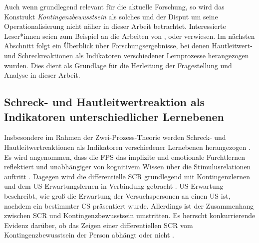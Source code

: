 		Auch wenn grundlegend relevant für die aktuelle Forschung, so wird das Konstrukt \textit{Kontingenzbewusstsein} als solches und der Disput um seine Operationalisierung nicht näher in dieser Arbeit betrachtet.
		Interessierte Leser*innen seien zum Beispiel an die Arbeiten von \textcite{LOVIBOND2002}, \textcite{WIENS2002} oder \textcite{MERTENS2020} verwiesen. Im nächsten Abschnitt folgt ein Überblick über Forschungsergebnisse, bei denen Hautleitwert- und Schreckreaktionen als Indikatoren verschiedener Lernprozesse herangezogen wurden. 
		Dies dient als Grundlage für die Herleitung der Fragestellung und Analyse in dieser Arbeit.

	\subsection{Schreck- und Hautleitwertreaktion als Indikatoren unterschiedlicher Lernebenen}	\label{dissociation}
		
		Insbesondere im Rahmen der Zwei-Prozess-Theorie werden Schreck- und Hautleitwertreaktionen als Indikatoren verschiedener Lernebenen herangezogen \parencite{HAMM1996, SEVENSTER2014}. Es wird angenommen, dass die FPS das implizite und emotionale Furchtlernen reflektiert und unabhängiger von kognitivem Wissen über die Stimulusrelationen auftritt \parencite[z.\,B.][]{SEVENSTER2014, HAMM2005}. Dagegen wird die differentielle SCR grundlegend mit Kontingenzlernen und dem US-Erwartungslernen in Verbindung gebracht \parencite[z.\,B.][]{HAMM2005, WEIKE2007}. US-Erwartung beschreibt, wie groß die Erwartung der Versuchspersonen an einen US ist, nachdem ein bestimmter CS präsentiert wurde. Allerdings ist der Zusammenhang zwischen SCR und Kontingenzbewusstsein umstritten.
		Es herrscht konkurrierende Evidenz darüber, ob das Zeigen einer differentiellen SCR vom Kontingenzbewusstsein der Person abhängt \parencite{DAWSON1973, HAMM1996, PURKIS2001, WEIKE2007} oder nicht \parencite{KNIGHT2003, SCHULTZ2010}.
		
